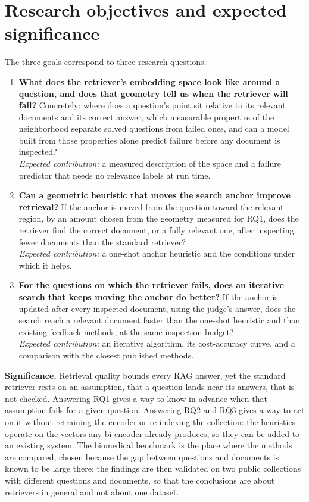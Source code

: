 \documentclass[12pt,a4paper]{article}
\begin{document}
\section{Research objectives and expected significance}

The three goals correspond to three research questions.

\begin{enumerate}[label=\textbf{RQ\arabic*.}, leftmargin=2.6em]
  \item \textbf{What does the retriever's embedding space look like around a question, and does that geometry tell us when the retriever will fail?} Concretely: where does a question's point sit relative to its relevant documents and its correct answer, which measurable properties of the neighborhood separate solved questions from failed ones, and can a model built from those properties alone predict failure before any document is inspected?\\[2pt] \textit{Expected contribution:} a measured description of the space and a failure predictor that needs no relevance labels at run time.
  \item \textbf{Can a geometric heuristic that moves the search anchor improve retrieval?} If the anchor is moved from the question toward the relevant region, by an amount chosen from the geometry measured for RQ1, does the retriever find the correct document, or a fully relevant one, after inspecting fewer documents than the standard retriever?\\[2pt] \textit{Expected contribution:} a one-shot anchor heuristic and the conditions under which it helps.
  \item \textbf{For the questions on which the retriever fails, does an iterative search that keeps moving the anchor do better?} If the anchor is updated after every inspected document, using the judge's answer, does the search reach a relevant document faster than the one-shot heuristic and than existing feedback methods, at the same inspection budget?\\[2pt] \textit{Expected contribution:} an iterative algorithm, its cost-accuracy curve, and a comparison with the closest published methods.
\end{enumerate}

\textbf{Significance.} Retrieval quality bounds every RAG answer, yet the standard retriever rests on an assumption, that a question lands near its answers, that is not checked. Answering RQ1 gives a way to know in advance when that assumption fails for a given question. Answering RQ2 and RQ3 gives a way to act on it without retraining the encoder or re-indexing the collection: the heuristics operate on the vectors any bi-encoder already produces, so they can be added to an existing system. The biomedical benchmark is the place where the methods are compared, chosen because the gap between questions and documents is known to be large there; the findings are then validated on two public collections with different questions and documents, so that the conclusions are about retrievers in general and not about one dataset.
\end{document}

